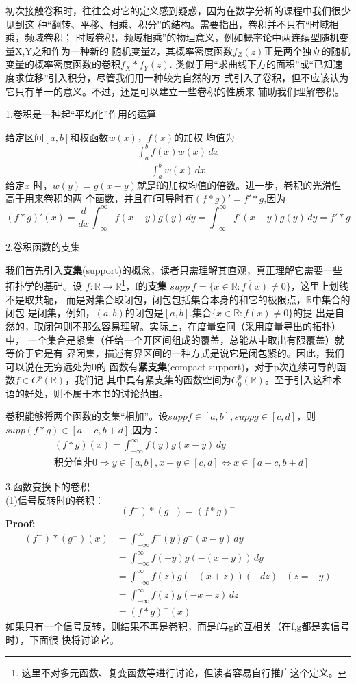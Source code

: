 \documentclass{ctexbook}
\begin{document}
初次接触卷积时，往往会对它的定义感到疑惑，因为在数学分析的课程中我们很少见到这
种“翻转、平移、相乘、积分”的结构。需要指出，卷积并不只有“时域相乘，频域卷积；
时域卷积，频域相乘”的物理意义，例如概率论中两连续型随机变量X,Y之和作为一种新的
随机变量Z，其概率密度函数$f_Z(z)$正是两个独立的随机变量的概率密度函数的卷积$f_X*f_Y(z)$.
类似于用“求曲线下方的面积”或“已知速度求位移”引入积分，尽管我们用一种较为自然的方
式引入了卷积，但不应该认为它只有单一的意义。不过，还是可以建立一些卷积的性质来
辅助我们理解卷积。

\noindent 1.卷积是一种起“平均化”作用的运算

给定区间$[a,b]$和权函数$w(x)$，$f(x)$的加权
均值为\[\frac{\int_{a}^{b}f(x)w(x)\,dx}{\int_{a}^{b}w(x)\,dx}\]给定$x$
时，$w(y)=g(x-y)$就是f的加权均值的倍数。进一步，卷积的光滑性高于用来卷积的两
个函数，并且在f可导时有$(f*g)'=f'*g$,因为
\[(f*g)'(x)=\frac{d}{dx}\int_{-\infty}^{\infty}f(x-y)g(y)\,dy=\int_{-\infty}^{\infty}f'(x-y)g(y)\,dy=f'*g\]

\noindent 2.卷积函数的支集

我们首先引入\textbf{支集}(support)的概念，读者只需理解其直观，真正理解它需要一些拓扑学的基础。设
$f:\mathbb{R}\to \mathbb{R}$\footnote{这里不对多元函数、复变函数等进行讨论，但读者容易自行推广这个定义。}，f的\textbf{支集}
$supp\ f=\overline{\{x\in\mathbb{R}:f(x)\neq 0\}}$，这里上划线不是取共轭，
而是对集合取闭包，闭包包括集合本身的和它的极限点，$\mathbb{R}$中集合的闭包
是闭集，例如，$(a,b)$的闭包是$[a,b]$.集合$\{x\in\mathbb{R}:f(x)\neq 0\}$的提
出是自然的，取闭包则不那么容易理解。实际上，在度量空间（采用度量导出的拓扑）中，
一个集合是紧集（任给一个开区间组成的覆盖，总能从中取出有限覆盖）就等价于它是有
界闭集，描述有界区间的一种方式是说它是闭包紧的。因此，我们可以说在无穷远处为0的
函数有\textbf{紧支集}(compact support)，对于p次连续可导的函数$f\in C^p(\mathbb{R})$，我们记
其中具有紧支集的函数空间为$C_0^p(\mathbb{R})$。至于引入这种术语的好处，则不属于本书的讨论范围。

卷积能够将两个函数的支集“相加”。设$supp f\in [a,b],supp g\in [c,d]$，则
$supp (f*g)\in [a+c,b+d]$,因为：
\begin{align*}
     & (f*g)(x) =\int_{-\infty}^{\infty}f(y)g(x-y)\,dy                               \\
     & \text{积分值非0}\Rightarrow y\in [a,b],x-y\in [c,d]\Leftrightarrow x\in [a+c,b+d]
\end{align*}

\noindent 3.函数变换下的卷积\\
(1)信号反转时的卷积：
\[(f^-)*(g^-)=(f*g)^-\]
\textbf{Proof:}
\begin{align*}
    (f^-)*(g^-)(x) & =\int_{-\infty}^{\infty}f^-(y)g^-(x-y)\,dy          \\
                   & =\int_{-\infty}^{\infty}f(-y)g(-(x-y))\,dy          \\
                   & =\int_{-\infty}^{\infty}f(z)g(-(x+z))(-dz) & (z=-y) \\
                   & =\int_{-\infty}^{\infty}f(z)g(-x-z)\,dz             \\
                   & =(f*g)^-(x)
\end{align*}
如果只有一个信号反转，则结果不再是卷积，而是f与g的互相关（在f,g都是实信号时），下面很
快将讨论它。
\end{document}
